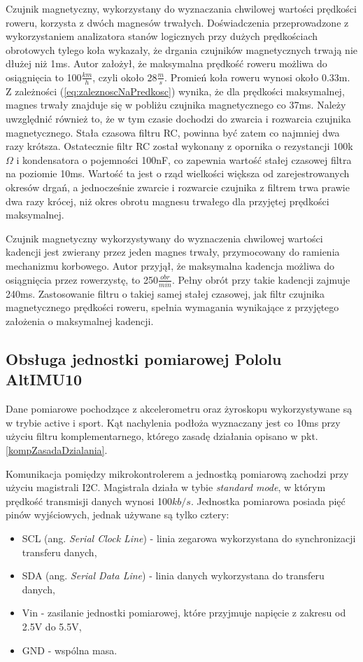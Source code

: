 Czujnik magnetyczny, wykorzystany do wyznaczania chwilowej wartości prędkości roweru, korzysta z dwóch magnesów trwałych. Doświadczenia przeprowadzone z wykorzystaniem analizatora stanów logicznych przy dużych prędkościach obrotowych tylego koła wykazały, że drgania czujników magnetycznych trwają nie dłużej niż 1ms.  Autor założył, że maksymalna prędkość roweru możliwa do osiągnięcia to 100$\frac{km}{h}$, czyli około 28$\frac{m}{s}$. Promień koła roweru wynosi około 0.33m. Z zależności (\ref{eq:zaleznoscNaPredkosc}) wynika, że dla prędkości maksymalnej, magnes trwały znajduje się w pobliżu czujnika magnetycznego co 37ms. Należy uwzględnić również to, że w tym czasie dochodzi do zwarcia i rozwarcia czujnika magnetycznego. Stała czasowa filtru RC, powinna być zatem co najmniej dwa razy krótsza. Ostatecznie filtr RC został wykonany z opornika o rezystancji 100k$\Omega$ i kondensatora o pojemności 100nF, co zapewnia wartość stałej czasowej filtra na poziomie 10ms. Wartość ta jest o rząd wielkości większa od zarejestrowanych okresów drgań, a jednocześnie zwarcie i rozwarcie czujnika z filtrem trwa prawie dwa razy krócej, niż okres obrotu magnesu trwałego dla przyjętej prędkości maksymalnej.

Czujnik magnetyczny wykorzystywany do wyznaczenia chwilowej wartości kadencji jest zwierany przez jeden magnes trwały, przymocowany do ramienia mechanizmu korbowego. Autor przyjął, że maksymalna kadencja możliwa do osiągnięcia przez rowerzystę, to 250$\frac{obr}{min}$. Pełny obrót przy takie kadencji zajmuje 240ms. Zastosowanie filtru o takiej samej stałej czasowej, jak filtr czujnika magnetycznego prędkości roweru, spełnia wymagania wynikające z przyjętego założenia o maksymalnej kadencji. 
\subsection{Obsługa jednostki pomiarowej Pololu AltIMU10}
Dane pomiarowe pochodzące z akcelerometru oraz żyroskopu wykorzystywane są w trybie active i sport. Kąt nachylenia podłoża wyznaczany jest co 10ms przy użyciu filtru komplementarnego, którego zasadę działania opisano w pkt. \ref{kompZasadaDzialania}. 
 
Komunikacja pomiędzy mikrokontrolerem a jednostką pomiarową zachodzi przy użyciu magistrali I2C. Magistrala działa w tybie \textit{standard mode}, w którym prędkość transmisji danych wynosi 100$kb/s$. Jednostka pomiarowa posiada pięć pinów wyjściowych, jednak używane są tylko cztery:
\begin{itemize}
    \item
    SCL (ang. {\em Serial Clock Line}) - linia zegarowa wykorzystana do synchronizacji transferu danych,
    \item
    SDA (ang. {\em Serial Data Line}) - linia danych wykorzystana do transferu danych,
    \item
    Vin - zasilanie jednostki pomiarowej, które przyjmuje napięcie z zakresu od 2.5V do 5.5V,
    \item
    GND - wspólna masa.
\end{itemize} 

